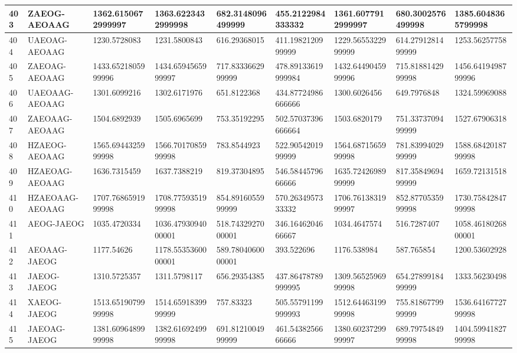 {\begin{longtable}{|l|l|l|l|l|l|l|l|l|}
        403 & ZAEOG-AEOAAG & 1362.6150672999997 & 1363.6223432999998 & 682.3148096499999 & 455.2122984333332 & 1361.6077912999997 & 680.3002576499998 & 1385.6048365799998 \\ \hline
        404 & UAEOAG-AEOAAG & 1230.5728083 & 1231.5800843 & 616.29368015 & 411.1982120999999 & 1229.5655322999999 & 614.2791281499999 & 1253.56257758 \\ \hline
        405 & ZAEOAG-AEOAAG & 1433.6521805999996 & 1434.6594565999997 & 717.8333662999999 & 478.89133619999984 & 1432.6449045999996 & 715.8188142999998 & 1456.6419498799996 \\ \hline
        406 & UAEOAAG-AEOAAG & 1301.6099216 & 1302.6171976 & 651.8122368 & 434.87724986666666 & 1300.6026456 & 649.7976848 & 1324.59969088 \\ \hline
        407 & ZAEOAAG-AEOAAG & 1504.6892939 & 1505.6965699 & 753.35192295 & 502.57037396666664 & 1503.6820179 & 751.3373709499999 & 1527.67906318 \\ \hline
        408 & HZAEOG-AEOAAG & 1565.6944325999998 & 1566.7017085999998 & 783.8544923 & 522.9054201999999 & 1564.6871565999998 & 781.8399402999999 & 1588.6842018799998 \\ \hline
        409 & HZAEOAG-AEOAAG & 1636.7315459 & 1637.7388219 & 819.37304895 & 546.5844579666666 & 1635.7242698999999 & 817.3584969499999 & 1659.72131518 \\ \hline
        410 & HZAEOAAG-AEOAAG & 1707.7686591999998 & 1708.7759351999998 & 854.8916055999999 & 570.2634957333332 & 1706.7613831999997 & 852.8770535999998 & 1730.7584284799998 \\ \hline
        411 & AEOG-JAEOG & 1035.4720334 & 1036.4793094000001 & 518.7432927000001 & 346.1646204666667 & 1034.4647574 & 516.7287407 & 1058.4618026800001 \\ \hline
        412 & AEOAAG-JAEOG & 1177.54626 & 1178.5535360000001 & 589.7804060000001 & 393.522696 & 1176.538984 & 587.765854 & 1200.53602928 \\ \hline
        413 & JAEOG-JAEOG & 1310.5725357 & 1311.5798117 & 656.29354385 & 437.86478789999995 & 1309.5652596999998 & 654.2789918499999 & 1333.56230498 \\ \hline
        414 & XAEOG-JAEOG & 1513.6519079999998 & 1514.6591839999999 & 757.83323 & 505.55791199999993 & 1512.6446319999998 & 755.8186779999999 & 1536.6416772799998 \\ \hline
        415 & JAEOAG-JAEOG & 1381.6096489999998 & 1382.6169249999998 & 691.8121004999999 & 461.5438256666666 & 1380.6023729999997 & 689.7975484999998 & 1404.5994182799998 \\ \hline

\end{longtable}}
